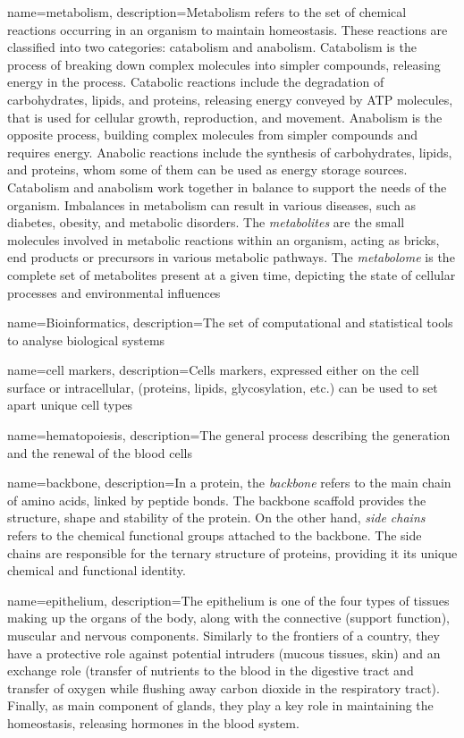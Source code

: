 {name=metabolism, 
description={Metabolism refers to the set of chemical reactions occurring in an organism to maintain homeostasis. These reactions are classified into two categories: catabolism and anabolism. Catabolism is the process of breaking down complex molecules into simpler compounds, releasing energy in the process. Catabolic reactions include the degradation of carbohydrates, lipids, and proteins, releasing energy conveyed by ATP molecules, that is used for cellular growth, reproduction, and movement. Anabolism is the opposite process,  building complex molecules from simpler compounds and requires energy. Anabolic reactions include the synthesis of carbohydrates, lipids, and proteins, whom some of them can be used as energy storage sources. Catabolism and anabolism work together in balance to support the needs of the organism. Imbalances in metabolism can result in various diseases, such as diabetes, obesity, and metabolic disorders.
The \textit{metabolites} are the small molecules involved in metabolic reactions within an organism, acting as bricks, end products or precursors in various metabolic pathways. The \textit{metabolome} is the complete set of metabolites present at a given time, depicting the state of cellular processes and environmental influences}}

{name=Bioinformatics, 
description={The set of computational and statistical tools to analyse biological systems}}

{name=cell markers, 
description={Cells markers, expressed either on the cell surface or intracellular, (proteins, lipids, glycosylation, etc.) can be used to set apart unique cell types}}

{name=hematopoiesis, 
description={The general process describing the generation and the renewal of the blood cells}}

{name=backbone, 
description={In a protein, the \textit{backbone} refers to the main chain of amino acids, linked by peptide bonds. The backbone scaffold provides the structure, shape and stability of the protein. On the other hand, \textit{side chains} refers to the chemical functional groups attached to the backbone. The side chains are responsible for the ternary structure of proteins, providing it its unique chemical and functional identity.
}}

{name=epithelium, 
description={The epithelium is one of the four types of tissues making up the organs of the body, along with the connective (support function), muscular and nervous components. 
Similarly to the frontiers of a country, they have a protective role against potential intruders (mucous tissues, skin) and an exchange role (transfer of nutrients to the blood in the digestive tract and transfer of oxygen while flushing away carbon dioxide in the respiratory tract). Finally, as main component of glands, they play a key role in maintaining the homeostasis, releasing hormones in the blood system.  
}}






